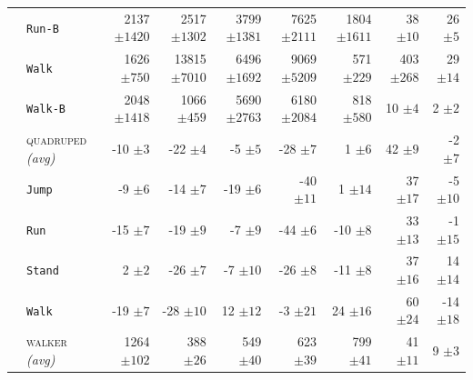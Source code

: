 \documentclass{article}
\theoremstyle{plain}
\theoremstyle{definition}
\theoremstyle{remark}
\newcommand{\domainavg}[1]{\textsc{#1} \textit{(avg)}}
\begin{document}
\begin{table}[H]
\begin{tabular}{l l r r r r r r r}
& \hspace{.5em} \texttt{Run-B} & 2137 ${\scriptstyle \pm 1420}$ & 2517 ${\scriptstyle \pm 1302}$ & 3799 ${\scriptstyle \pm 1381}$ & 7625 ${\scriptstyle \pm 2111}$ & 1804 ${\scriptstyle \pm 1611}$ & 38 ${\scriptstyle \pm 10}$ & 26 ${\scriptstyle \pm 5}$ \\
& \hspace{.5em} \texttt{Walk} & 1626 ${\scriptstyle \pm 750}$ & 13815 ${\scriptstyle \pm 7010}$ & 6496 ${\scriptstyle \pm 1692}$ & 9069 ${\scriptstyle \pm 5209}$ & 571 ${\scriptstyle \pm 229}$ & 403 ${\scriptstyle \pm 268}$ & 29 ${\scriptstyle \pm 14}$ \\
& \hspace{.5em} \texttt{Walk-B} & 2048 ${\scriptstyle \pm 1418}$ & 1066 ${\scriptstyle \pm 459}$ & 5690 ${\scriptstyle \pm 2763}$ & 6180 ${\scriptstyle \pm 2084}$ & 818 ${\scriptstyle \pm 580}$ & 10 ${\scriptstyle \pm 4}$ & 2 ${\scriptstyle \pm 2}$ \\
\addlinespace
 \rowcolor{gray!15}  \cellcolor{white} & \domainavg{quadruped} & -10 ${\scriptstyle \pm 3}$ & -22 ${\scriptstyle \pm 4}$ & -5 ${\scriptstyle \pm 5}$ & -28 ${\scriptstyle \pm 7}$ & 1 ${\scriptstyle \pm 6}$ & 42 ${\scriptstyle \pm 9}$ & -2 ${\scriptstyle \pm 7}$ \\
& \hspace{.5em} \texttt{Jump} & -9 ${\scriptstyle \pm 6}$ & -14 ${\scriptstyle \pm 7}$ & -19 ${\scriptstyle \pm 6}$ & -40 ${\scriptstyle \pm 11}$ & 1 ${\scriptstyle \pm 14}$ & 37 ${\scriptstyle \pm 17}$ & -5 ${\scriptstyle \pm 10}$ \\
& \hspace{.5em} \texttt{Run} & -15 ${\scriptstyle \pm 7}$ & -19 ${\scriptstyle \pm 9}$ & -7 ${\scriptstyle \pm 9}$ & -44 ${\scriptstyle \pm 6}$ & -10 ${\scriptstyle \pm 8}$ & 33 ${\scriptstyle \pm 13}$ & -1 ${\scriptstyle \pm 15}$ \\
& \hspace{.5em} \texttt{Stand} & 2 ${\scriptstyle \pm 2}$ & -26 ${\scriptstyle \pm 7}$ & -7 ${\scriptstyle \pm 10}$ & -26 ${\scriptstyle \pm 8}$ & -11 ${\scriptstyle \pm 8}$ & 37 ${\scriptstyle \pm 16}$ & 14 ${\scriptstyle \pm 14}$ \\
& \hspace{.5em} \texttt{Walk} & -19 ${\scriptstyle \pm 7}$ & -28 ${\scriptstyle \pm 10}$ & 12 ${\scriptstyle \pm 12}$ & -3 ${\scriptstyle \pm 21}$ & 24 ${\scriptstyle \pm 16}$ & 60 ${\scriptstyle \pm 24}$ & -14 ${\scriptstyle \pm 18}$ \\
\addlinespace
 \rowcolor{gray!15}  \cellcolor{white} & \domainavg{walker} & 1264 ${\scriptstyle \pm 102}$ & 388 ${\scriptstyle \pm 26}$ & 549 ${\scriptstyle \pm 40}$ & 623 ${\scriptstyle \pm 39}$ & 799 ${\scriptstyle \pm 41}$ & 41 ${\scriptstyle \pm 11}$ & 9 ${\scriptstyle \pm 3}$ \\

\end{tabular}
\end{table}
\end{document}
